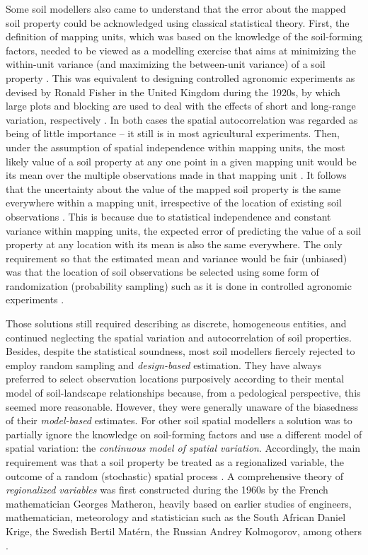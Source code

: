 Some soil modellers also came to understand that the error about the mapped soil property could be 
acknowledged using classical statistical theory. First, the definition of mapping units, which was based on 
the knowledge of the soil-forming factors, needed to be viewed as a modelling exercise that aims at minimizing 
the within-unit variance (and maximizing the between-unit variance) of a soil property \cite{VoltzEtAl1990}. 
This was equivalent to designing controlled agronomic experiments as devised by Ronald Fisher in the United 
Kingdom during the 1920s, by which large plots and blocking are used to deal with the effects of short and 
long-range variation, respectively \cite{WebsterEtAl2007}. In both cases the spatial autocorrelation was 
regarded as being of little importance -- it still is in most agricultural experiments. Then, under the 
assumption of spatial independence within mapping units, the most likely value of a soil property at any one 
point in a given mapping unit would be its mean over the multiple observations made in that mapping unit 
\cite{VoltzEtAl1990, Cressie1993}. It follows that the uncertainty about the value of the mapped soil property
is the same everywhere within a mapping unit, irrespective of the location of existing soil observations 
\cite{Heuvelink1996}. This is because due to statistical independence and constant variance within mapping 
units, the expected error of predicting the value of a soil property at any location with its mean is also the
same everywhere. The only requirement so that the estimated mean and variance would be fair (unbiased) was 
that the location of soil observations be selected using some form of randomization (probability sampling) 
such as it is done in controlled agronomic experiments \cite{deGruijterEtAl1990}.

Those solutions still required describing  as discrete, homogeneous entities, and continued 
neglecting the spatial variation and autocorrelation of soil properties. Besides, despite the statistical 
soundness, most soil modellers fiercely rejected to employ random sampling and \emph{design-based} estimation. 
They have always preferred to select observation locations purposively according to their mental model of 
soil-landscape relationships because, from a pedological perspective, this seemed more reasonable. However, 
they were generally unaware of the biasedness of their \emph{model-based} estimates. For other soil spatial 
modellers a solution was to partially ignore the knowledge on soil-forming factors and use a different model 
of spatial variation: the \emph{continuous model of spatial variation}. Accordingly, the main requirement was 
that a soil property be treated as a regionalized variable, the outcome of a random (stochastic) spatial 
process \cite{Cressie1993, Webster2000}. A comprehensive theory of \emph{regionalized variables} was first 
constructed during the 1960s by the French mathematician Georges Matheron, heavily based on earlier studies of 
engineers, mathematician, meteorology and statistician such as the South African Daniel Krige, the Swedish 
Bertil Matérn, the Russian Andrey Kolmogorov, among others \cite{Krige1951, Matern1960, Matheron1965, 
MatheronEtAl1987, Cressie1990, WebsterEtAl2007}.


